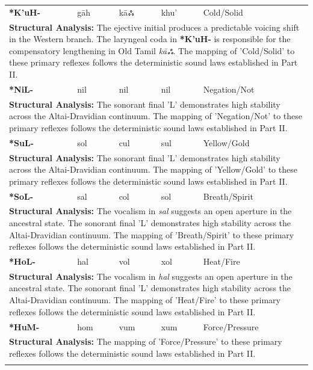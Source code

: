 \begin{longtable}{p{} p{} p{} p{} p{}}
\textbf{*K'uH-} & gāh & kāஃ & khu' & Cold/Solid \\ 
\multicolumn{5}{p{\textwidth}}{\small \textbf{Structural Analysis:} The ejective initial produces a predictable voicing shift in the Western branch. The laryngeal coda in \textbf{*K'uH-} is responsible for the compensatory lengthening in Old Tamil \textit{kāஃ}. The mapping of 'Cold/Solid' to these primary reflexes follows the deterministic sound laws established in Part II.} \\ \addlinespace[15pt] 
\textbf{*NiL-} & nil & nil & nil & Negation/Not \\ 
\multicolumn{5}{p{\textwidth}}{\small \textbf{Structural Analysis:} The sonorant final 'L' demonstrates high stability across the Altai-Dravidian continuum. The mapping of 'Negation/Not' to these primary reflexes follows the deterministic sound laws established in Part II.} \\ \addlinespace[15pt] 
\textbf{*SuL-} & sol & cul & sul & Yellow/Gold \\ 
\multicolumn{5}{p{\textwidth}}{\small \textbf{Structural Analysis:} The sonorant final 'L' demonstrates high stability across the Altai-Dravidian continuum. The mapping of 'Yellow/Gold' to these primary reflexes follows the deterministic sound laws established in Part II.} \\ \addlinespace[15pt] 
\textbf{*SoL-} & sal & col & sol & Breath/Spirit \\ 
\multicolumn{5}{p{\textwidth}}{\small \textbf{Structural Analysis:} The vocalism in \textit{sal} suggests an open aperture in the ancestral state. The sonorant final 'L' demonstrates high stability across the Altai-Dravidian continuum. The mapping of 'Breath/Spirit' to these primary reflexes follows the deterministic sound laws established in Part II.} \\ \addlinespace[15pt] 
\textbf{*HoL-} & hal & vol & xol & Heat/Fire \\ 
\multicolumn{5}{p{\textwidth}}{\small \textbf{Structural Analysis:} The vocalism in \textit{hal} suggests an open aperture in the ancestral state. The sonorant final 'L' demonstrates high stability across the Altai-Dravidian continuum. The mapping of 'Heat/Fire' to these primary reflexes follows the deterministic sound laws established in Part II.} \\ \addlinespace[15pt] 
\textbf{*HuM-} & hom & vum & xum & Force/Pressure \\ 
\multicolumn{5}{p{\textwidth}}{\small \textbf{Structural Analysis:}  The mapping of 'Force/Pressure' to these primary reflexes follows the deterministic sound laws established in Part II.} \\ \addlinespace[15pt] 

\end{longtable}

